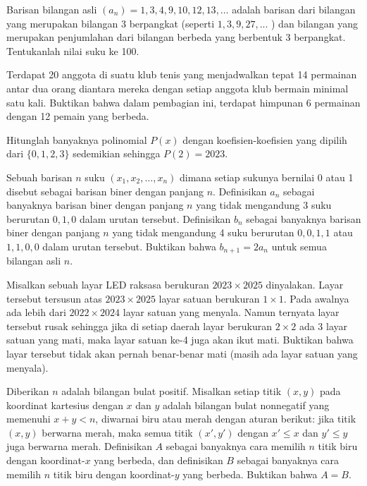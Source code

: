 \documentclass[11pt]{scrartcl}
\begin{document}
\begin{soaljawab}
Barisan bilangan asli $(a_n) = 1,3,4,9,10,12,13,\dots$ adalah barisan dari bilangan yang merupakan bilangan 3 berpangkat (seperti $1,3,9,27,...$ ) dan bilangan yang merupakan penjumlahan dari bilangan berbeda yang berbentuk 3 berpangkat. Tentukanlah nilai suku ke 100.
\end{soaljawab}

\begin{soaljawab}
Terdapat 20 anggota di suatu klub tenis yang menjadwalkan tepat 14 permainan antar dua orang diantara mereka dengan setiap anggota klub bermain minimal satu kali. Buktikan bahwa dalam pembagian ini, terdapat himpunan 6 permainan dengan 12 pemain yang berbeda.
\end{soaljawab}

\begin{soaljawab}
    Hitunglah banyaknya polinomial $P(x)$ dengan koefisien-koefisien yang dipilih dari $\{0, 1, 2, 3\}$ sedemikian sehingga $P(2) = 2023$.
\end{soaljawab}

\begin{soaljawab}
    Sebuah barisan $n$ suku $(x_1,x_2,\dots,x_n)$ dimana setiap sukunya bernilai 0 atau 1 disebut sebagai barisan biner dengan panjang $n$. Definisikan $a_n$ sebagai banyaknya barisan biner dengan panjang $n$ yang tidak mengandung 3 suku berurutan $0,1,0$ dalam urutan tersebut. Definisikan $b_n$ sebagai banyaknya barisan biner dengan panjang $n$ yang tidak mengandung 4 suku berurutan $0,0,1,1$ atau $1,1,0,0$  dalam urutan tersebut. Buktikan bahwa $b_{n+1} = 2a_{n}$ untuk semua bilangan asli $n$.
\end{soaljawab}

\begin{soaljawab}
    Misalkan sebuah layar LED raksasa berukuran $2023 \times 2025$ dinyalakan. Layar tersebut tersusun atas $2023 \times 2025$ layar satuan berukuran $1 \times 1$. Pada awalnya ada lebih dari $2022 \times 2024$ layar satuan yang menyala. Namun ternyata layar tersebut rusak sehingga jika di setiap daerah layar berukuran $2 \times 2$ ada 3 layar satuan yang mati, maka layar satuan ke-4 juga akan ikut mati. Buktikan bahwa layar tersebut tidak akan pernah benar-benar mati (masih ada layar satuan yang menyala).
\end{soaljawab}

\begin{soaljawab}
    Diberikan $n$ adalah bilangan bulat positif. Misalkan setiap titik $(x,y)$ pada koordinat kartesius dengan $x$ dan $y$ adalah bilangan bulat nonnegatif yang memenuhi $x+y < n$, diwarnai biru atau merah dengan aturan berikut: jika titik $(x,y)$ berwarna merah, maka semua titik $(x',y')$ dengan $x' \le x$ dan $y' \le y$ juga berwarna merah. Definisikan $A$ sebagai banyaknya cara memilih $n$ titik biru dengan koordinat-$x$ yang berbeda, dan definisikan $B$ sebagai banyaknya cara memilih $n$ titik biru dengan koordinat-$y$ yang berbeda. Buktikan bahwa $A=B$.
\end{soaljawab}
\end{document}
